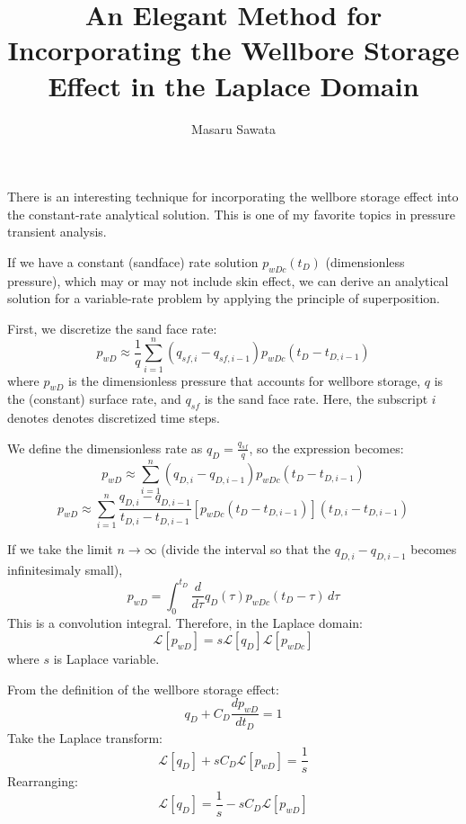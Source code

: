 \documentclass[letterpaper, 12pt]{article}
\title{An Elegant Method for Incorporating the Wellbore Storage Effect in the Laplace Domain}
\author{Masaru Sawata}
\theoremstyle{custom}
\begin{document}
\maketitle
There is an interesting technique for incorporating the wellbore storage effect into the constant-rate analytical solution.
This is one of my favorite topics in pressure transient analysis.

If we have a constant (sandface) rate solution $p_{wDc}(t_D)$ (dimensionless pressure), which may or may not include skin effect,
we can derive an analytical solution for a variable-rate problem by applying the principle of superposition.

First, we discretize the sand face rate:
\begin{equation*}
  p_{wD} \approx \frac{1}{q} \sum_{i=1}^{n} (q_{sf,i} - q_{sf,i-1}) p_{wDc} \left( t_{D} - t_{D,i-1} \right)
\end{equation*}
where $p_{wD}$ is the dimensionless pressure  that accounts for wellbore storage, $q$ is the (constant) surface rate, and $q_{sf}$ is the sand face rate.
Here, the subscript $i$ denotes denotes discretized time steps.

We define the dimensionless rate as $q_D = \displaystyle \frac{q_{sf}}{q}$, so the expression becomes:
\begin{equation*}
  p_{wD} \approx \sum_{i=1}^{n} (q_{D,i} - q_{D,i-1}) p_{wDc}\left( t_{D} - t_{D,i-1} \right)
\end{equation*}
\begin{equation*}
  p_{wD} \approx \sum_{i=1}^{n} \frac{q_{D,i} - q_{D,i-1}}{t_{D,i} - t_{D,i-1}} \left[ p_{wDc}\left( t_{D} - t_{D,i-1} \right) \right] \left( t_{D,i} - t_{D,i-1} \right)
\end{equation*}

If we take the limit $n \rightarrow \infty$ (divide the interval so that the $q_{D,i} - q_{D,i-1}$ becomes infinitesimaly small), 
\begin{equation*}
  p_{wD} = \int_{0}^{t_D} \frac{d}{d \tau}q_D(\tau) p_{wDc}(t_D - \tau) \, d\tau
\end{equation*}
This is a convolution integral.  Therefore, in the Laplace domain:
\begin{equation}
  \label{eq1}
  \mathcal{L} \left[ p_{wD} \right] = s \mathcal{L} \left[ q_D \right] \mathcal{L} \left[ p_{wDc} \right]
\end{equation}
where $s$ is Laplace variable.

From the definition of the wellbore storage effect:
\begin{equation*}
  q_D + C_D \frac{d p_{wD}}{d t_D} = 1
\end{equation*}
Take the Laplace transform:
\begin{equation*}
  \mathcal{L} \left[ q_D \right] + s C_D \mathcal{L} \left[ p_{wD} \right]  = \frac{1}{s}
\end{equation*}
Rearranging:
\begin{equation}
  \label{eq2}
  \mathcal{L} \left[ q_D \right]  = \frac{1}{s} - s C_D \mathcal{L} \left[ p_{wD} \right]
\end{equation}
\end{document}
